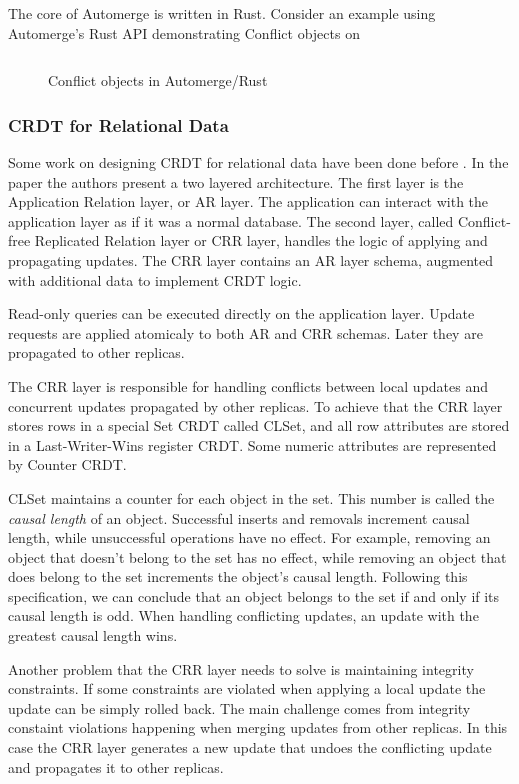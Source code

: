 \documentclass[a4paper, 11pt, oneside]{article}
\theoremstyle{definition}
\begin{document}
The core of Automerge is written in Rust. Consider an example using Automerge's Rust API demonstrating Conflict objects on 

\begin{figure}
    \inputminted[frame=single,linenos,breaklines]{rust}{lst/automerge.rs}
    \caption{Conflict objects in Automerge/Rust}
    \label{fig:automergecode}
\end{figure}

\subsubsection{CRDT for Relational Data}

Some work on designing CRDT for relational data have been done before \cite{relcrdt}. In the paper the authors present a two layered architecture. The first layer is the Application Relation layer, or AR layer. The application can interact with the application layer as if it was a normal database. The second layer, called Conflict-free Replicated Relation layer or CRR layer, handles the logic of applying and propagating updates. The CRR layer contains an AR layer schema, augmented with additional data to implement CRDT logic.

Read-only queries can be executed directly on the application layer. Update requests are applied atomicaly to both AR and CRR schemas. Later they are propagated to other replicas.

The CRR layer is responsible for handling conflicts between local updates and concurrent updates propagated by other replicas. To achieve that the CRR layer stores rows in a special Set CRDT called CLSet, and all row attributes are stored in a Last-Writer-Wins register CRDT. Some numeric attributes are represented by Counter CRDT.

CLSet maintains a counter for each object in the set. This number is called the \textit{causal length} of an object. Successful inserts and removals increment causal length, while unsuccessful operations have no effect. For example, removing an object that doesn't belong to the set has no effect, while removing an object that does belong to the set increments the object's causal length. Following this specification, we can conclude that an object belongs to the set if and only if its causal length is odd. When handling conflicting updates, an update with the greatest causal length wins.

Another problem that the CRR layer needs to solve is maintaining integrity constraints. If some constraints are violated when applying a local update the update can be simply rolled back. The main challenge comes from integrity constaint violations happening when merging updates from other replicas. In this case the CRR layer generates a new update that undoes the conflicting update and propagates it to other replicas.
\end{document}
